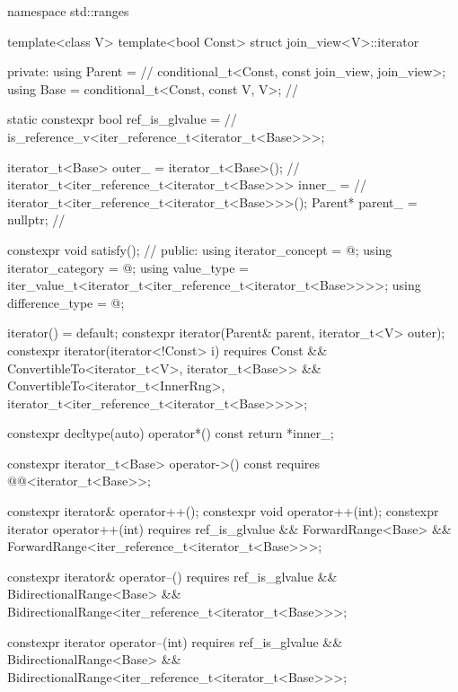 \pnum
\begin{codeblock}
namespace std::ranges {
template<class V>
  template<bool Const>
  struct join_view<V>::iterator {
  private:
    using Parent =                                              // \expos
      conditional_t<Const, const join_view, join_view>;
    using Base   = conditional_t<Const, const V, V>;            // \expos

    static constexpr bool ref_is_glvalue =                      // \expos
      is_reference_v<iter_reference_t<iterator_t<Base>>>;

    iterator_t<Base> outer_ = iterator_t<Base>();               // \expos
    iterator_t<iter_reference_t<iterator_t<Base>>> inner_ =     // \expos
      iterator_t<iter_reference_t<iterator_t<Base>>>();
    Parent* parent_ = nullptr;                                  // \expos

    constexpr void satisfy();                                   // \expos
  public:
    using iterator_concept  = @\seebelow@;
    using iterator_category = @\seebelow@;
    using value_type        =
      iter_value_t<iterator_t<iter_reference_t<iterator_t<Base>>>>;
    using difference_type   = @\seebelow@;

    iterator() = default;
    constexpr iterator(Parent& parent, iterator_t<V> outer);
    constexpr iterator(iterator<!Const> i)
      requires Const &&
               ConvertibleTo<iterator_t<V>, iterator_t<Base>> &&
               ConvertibleTo<iterator_t<InnerRng>,
                             iterator_t<iter_reference_t<iterator_t<Base>>>>;

    constexpr decltype(auto) operator*() const { return *inner_; }

    constexpr iterator_t<Base> operator->() const
      requires @@<iterator_t<Base>>;

    constexpr iterator& operator++();
    constexpr void operator++(int);
    constexpr iterator operator++(int)
      requires ref_is_glvalue && ForwardRange<Base> &&
               ForwardRange<iter_reference_t<iterator_t<Base>>>;

    constexpr iterator& operator--()
      requires ref_is_glvalue && BidirectionalRange<Base> &&
               BidirectionalRange<iter_reference_t<iterator_t<Base>>>;

    constexpr iterator operator--(int)
      requires ref_is_glvalue && BidirectionalRange<Base> &&
               BidirectionalRange<iter_reference_t<iterator_t<Base>>>;

}}
\end{codeblock}
